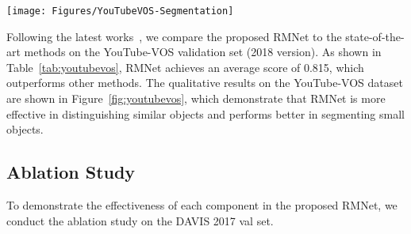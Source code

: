 \documentclass[final]{cvpr}
\begin{document}
\begin{figure*}
  \resizebox{\linewidth}{!} {
    \texttt{[image: Figures/YouTubeVOS-Segmentation]}
  }
  \caption{The challenging examples of multi-object video segmentation on the YouTube-VOS validation set (2018 version). All methods are tested at 720p without test-time augmentation. For the first video, both STM~\cite{DBLP:conf/iccv/OhLXK19} and EGMN~\cite{DBLP:conf/eccv/LuWDZSG20} fail to segment the target objects before the 115-th frame.}
  \label{fig:youtubevos}
  \vspace{-2 mm}
\end{figure*}

Following the latest works~\cite{DBLP:conf/iccv/OhLXK19,DBLP:conf/eccv/SeongHK20}, we compare the proposed RMNet to the state-of-the-art methods on the YouTube-VOS validation set (2018 version).
As shown in Table~\ref{tab:youtubevos}, RMNet achieves an average score of 0.815, which outperforms other methods.
The qualitative results on the YouTube-VOS dataset are shown in Figure~\ref{fig:youtubevos}, which demonstrate that RMNet is more effective in distinguishing similar objects and performs better in segmenting small objects.

\subsection{Ablation Study}

To demonstrate the effectiveness of each component in the proposed RMNet, we conduct the ablation study on the DAVIS 2017 val set.
\end{document}

